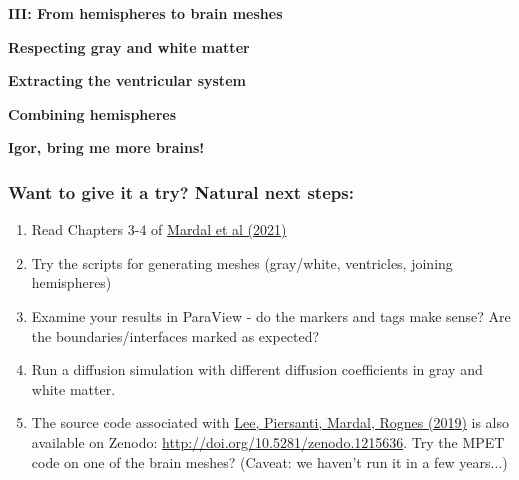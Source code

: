 \documentclass[10pt, mathserif, aspectratio=169, t]{beamer}
\newcommand{\mysection}[1]{\begin{frame} \begin{center} \vspace{3em} \textbf{#1} \end{center} \end{frame}}
\newcommand{\videosection}[3]{\begin{frame} \begin{center} \vspace{3em} \href{#2}{\textcolor{rognesred}{\textbf{#1}}} \end{center} #3 \end{frame}}
\begin{document}


\mysection{III: From hemispheres to brain meshes}

\mysection{Respecting gray and white matter}


\mysection{Extracting the ventricular system}


\mysection{Combining hemispheres}






\mysection{Igor, bring me more brains!}
 
\begin{frame}
\frametitle{Want to give it a try? Natural next steps:}
\begin{enumerate}
\item
  Read Chapters 3-4 of \href{https://github.com/kent-and/mri2fem}{Mardal et al (2021)}
\item
  Try the scripts for generating meshes (gray/white, ventricles,
  joining hemispheres)
\item
  Examine your results in ParaView - do the markers and tags make
  sense? Are the boundaries/interfaces marked as expected?
\item
  Run a diffusion simulation with different diffusion coefficients in
  gray and white matter.
\item
  The source code associated with
  \href{https://doi.org/10.1137/18M1182395}{Lee, Piersanti, Mardal,
    Rognes (2019)} is also available on Zenodo:
  \href{http://doi.org/10.5281/zenodo.1215636}{http://doi.org/10.5281/zenodo.1215636}.
  Try the MPET code on one of the brain meshes? (Caveat: we haven't run it in a
  few years...)
\end{enumerate}
\end{frame}

\end{document}
